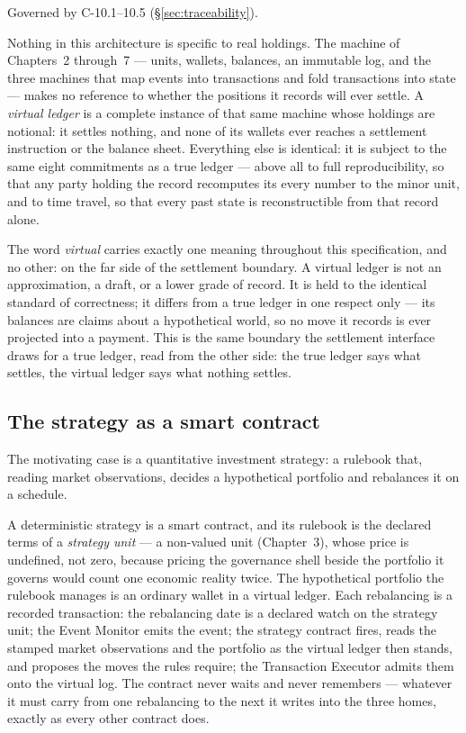 \documentclass[11pt,a4paper]{article}
\begin{document}
Governed by C-10.1--10.5 (\S\ref{sec:traceability}).

Nothing in this architecture is specific to real holdings. The machine of
Chapters~2 through~7 --- units, wallets, balances, an immutable log, and the
three machines that map events into transactions and fold transactions into
state --- makes no reference to whether the positions it records will ever
settle. A \emph{virtual ledger} is a complete instance of that same machine
whose holdings are notional: it settles nothing, and none of its wallets ever
reaches a settlement instruction or the balance sheet. Everything else is
identical: it is subject to the same eight commitments as a true ledger --- above all to full
reproducibility, so that any party holding the record recomputes its every
number to the minor unit, and to time travel, so that every past state is
reconstructible from that record alone.

The word \emph{virtual} carries exactly one meaning throughout this
specification, and no other: on the far side of the settlement boundary. A
virtual ledger is not an approximation, a draft, or a lower grade of record. It
is held to the identical standard of correctness; it differs from a true ledger
in one respect only --- its balances are claims about a hypothetical world, so
no move it records is ever projected into a payment. This is the same boundary
the settlement interface draws for a true ledger, read from the other side: the
true ledger says what settles, the virtual ledger says what nothing settles.

\subsection{The strategy as a smart contract}

The motivating case is a quantitative investment strategy: a rulebook that,
reading market observations, decides a hypothetical portfolio and rebalances it
on a schedule.

A deterministic strategy is a smart contract, and its rulebook is the declared
terms of a \emph{strategy unit} --- a non-valued unit (Chapter~3), whose price is
undefined, not zero, because pricing the governance shell beside the portfolio it
governs would count one economic reality twice. The hypothetical portfolio the
rulebook manages is an ordinary wallet in a virtual ledger. Each rebalancing is a
recorded transaction: the rebalancing date is a declared watch on the strategy
unit; the Event Monitor emits the event; the strategy contract fires, reads the
stamped market observations and the portfolio as the virtual ledger then stands,
and proposes the moves the rules require; the Transaction Executor admits them
onto the virtual log. The contract never waits and never remembers --- whatever
it must carry from one rebalancing to the next it writes into the three homes,
exactly as every other contract does.
\end{document}
